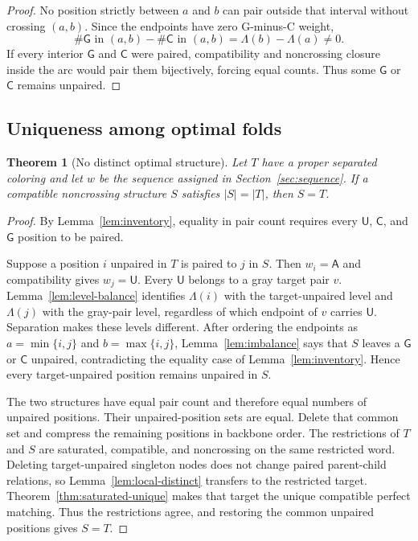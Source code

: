 \documentclass[11pt]{article}
\newtheorem{theorem}{Theorem}[section]
\newcommand{\A}{\textsf{A}}
\newcommand{\C}{\textsf{C}}
\newcommand{\G}{\textsf{G}}
\newcommand{\U}{\textsf{U}}
\begin{document}
\begin{proof}
No position strictly between $a$ and $b$ can pair outside that interval without crossing $(a,b)$.  Since the endpoints have zero G-minus-C weight,
\[
\#\G\text{ in }(a,b)-\#\C\text{ in }(a,b)
=
\Lambda(b)-\Lambda(a)\ne0.
\]
If every interior $\G$ and $\C$ were paired, compatibility and noncrossing closure inside the arc would pair them bijectively, forcing equal counts.  Thus some $\G$ or $\C$ remains unpaired.
\end{proof}

\subsection{Uniqueness among optimal folds}

\begin{theorem}[No distinct optimal structure]
\label{thm:no-tie}
Let $T$ have a proper separated coloring and let $w$ be the sequence assigned in Section~\ref{sec:sequence}.  If a compatible noncrossing structure $S$ satisfies $|S|=|T|$, then $S=T$.
\end{theorem}

\begin{proof}
By Lemma~\ref{lem:inventory}, equality in pair count requires every $\U$, $\C$, and $\G$ position to be paired.

Suppose a position $i$ unpaired in $T$ is paired to $j$ in $S$.  Then $w_i=\A$ and compatibility gives $w_j=\U$.  Every $\U$ belongs to a gray target pair $v$.  Lemma~\ref{lem:level-balance} identifies $\Lambda(i)$ with the target-unpaired level and $\Lambda(j)$ with the gray-pair level, regardless of which endpoint of $v$ carries $\U$.  Separation makes these levels different.  After ordering the endpoints as $a=\min\{i,j\}$ and $b=\max\{i,j\}$, Lemma~\ref{lem:imbalance} says that $S$ leaves a $\G$ or $\C$ unpaired, contradicting the equality case of Lemma~\ref{lem:inventory}.  Hence every target-unpaired position remains unpaired in $S$.

The two structures have equal pair count and therefore equal numbers of unpaired positions.  Their unpaired-position sets are equal.  Delete that common set and compress the remaining positions in backbone order.  The restrictions of $T$ and $S$ are saturated, compatible, and noncrossing on the same restricted word.  Deleting target-unpaired singleton nodes does not change paired parent-child relations, so Lemma~\ref{lem:local-distinct} transfers to the restricted target.  Theorem~\ref{thm:saturated-unique} makes that target the unique compatible perfect matching.  Thus the restrictions agree, and restoring the common unpaired positions gives $S=T$.
\end{proof}
\end{document}

